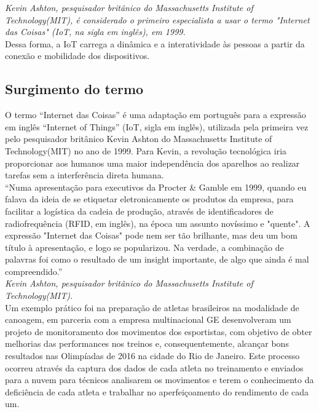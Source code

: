 \documentclass{classe_cn}                 %
\begin{document}
\textit{Kevin Ashton, pesquisador britânico do Massachusetts Institute of Technology(MIT), 
é considerado o primeiro especialista a usar o termo "Internet das Coisas" (IoT, na sigla em inglês), em 1999.}\\

Dessa forma, a IoT carrega a dinâmica e a interatividade às pessoas a partir 
da conexão e mobilidade dos dispositivos. 

\subsection{Surgimento do termo} %
O termo “Internet das Coisas” é uma adaptação em português para a expressão em 
inglês “Internet of Things” (IoT, sigla em inglês), utilizada pela primeira 
vez pelo pesquisador britânico Kevin Ashton do Massachusetts Institute of 
Technology(MIT) no ano de 1999. Para Kevin, a revolução tecnológica iria 
proporcionar aos humanos uma maior independência dos aparelhos ao realizar 
tarefas sem a interferência direta humana.\\

“Numa apresentação para executivos da Procter & Gamble em 1999, quando eu 
falava da ideia de se etiquetar eletronicamente os produtos da empresa, 
para facilitar a logística da cadeia de produção, através de identificadores 
de radiofrequência (RFID, em inglês), na época um assunto novíssimo e "quente". 
A expressão "Internet das Coisas" pode nem ser tão brilhante, mas deu um bom 
título à apresentação, e logo se popularizou. Na verdade, a combinação de 
palavras foi como o resultado de um insight importante, de algo que ainda 
é mal compreendido.”\\

\textit{Kevin Ashton, pesquisador britânico do Massachusetts Institute of Technology(MIT).}\\

Um exemplo prático foi na preparação de atletas brasileiros na modalidade de canoagem, 
em parceria com a empresa multinacional GE desenvolveram um projeto de monitoramento 
dos movimentos dos esportistas, com objetivo de obter melhorias das performances nos 
treinos e, consequentemente, alcançar bons resultados nas Olimpíadas de 2016 na 
cidade do Rio de Janeiro. Este processo ocorreu através da captura dos dados de 
cada atleta no treinamento e enviados para a nuvem para técnicos analisarem os 
movimentos e terem o conhecimento da deficiência de cada atleta e trabalhar no 
aperfeiçoamento do rendimento de cada um.
\end{document}
